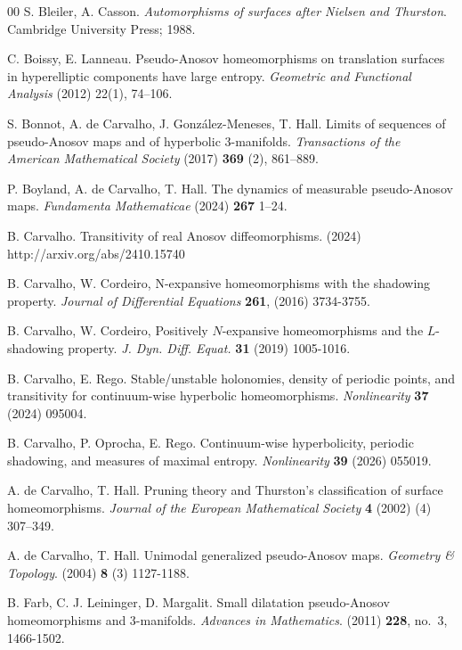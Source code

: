 \documentclass{amsart}
\theoremstyle{plain}
\theoremstyle{definition}
\begin{document}
\begin{thebibliography}{00}
 S. Bleiler, A. Casson. \emph{Automorphisms of surfaces after Nielsen and Thurston}. Cambridge University Press; 1988. 

 C. Boissy, E. Lanneau. Pseudo-Anosov homeomorphisms on translation surfaces in hyperelliptic components have large entropy. \emph{Geometric and Functional Analysis} (2012) 22(1), 74–106. 

 S. Bonnot, A. de Carvalho, J. González-Meneses, T. Hall. Limits of sequences of pseudo-Anosov maps and of hyperbolic 3-manifolds. \emph{Transactions of the American Mathematical Society} (2017) \textbf{369} (2), 861–889.

 P. Boyland, A. de Carvalho, T. Hall. The dynamics of measurable pseudo-Anosov maps. \emph{Fundamenta Mathematicae} (2024) \textbf{267} 1–24.

 B. Carvalho. Transitivity of real Anosov diffeomorphisms. (2024) http://arxiv.org/abs/2410.15740

 B. Carvalho, W. Cordeiro, N-expansive homeomorphisms with the shadowing property. \emph{Journal of Differential Equations} \textbf{261}, (2016) 3734-3755.
	
 B. Carvalho, W. Cordeiro, Positively $N$-expansive homeomorphisms and the $L$-shadowing property. \emph{J. Dyn. Diff. Equat.} \textbf{31} (2019) 1005-1016.

 B. Carvalho, E. Rego. Stable/unstable holonomies, density of periodic points, and transitivity for continuum-wise hyperbolic homeomorphisms. \emph{Nonlinearity} \textbf{37} (2024) 095004.

 B. Carvalho, P. Oprocha, E. Rego. Continuum-wise hyperbolicity, periodic shadowing, and measures of maximal entropy. \emph{Nonlinearity} \textbf{39} (2026) 055019.

 A. de Carvalho, T. Hall. Pruning theory and Thurston’s classification of surface homeomorphisms. \emph{Journal of the European Mathematical Society} \textbf{4} (2002) (4) 307–349.

 A. de Carvalho, T. Hall. Unimodal generalized pseudo-Anosov maps. \emph{Geometry \& Topology}. (2004) \textbf{8} (3) 1127-1188.

 B. Farb, C. J. Leininger, D. Margalit. Small dilatation pseudo-Anosov homeomorphisms and 3-manifolds. \emph{Advances in Mathematics}. (2011) {\bf 228}, no.~3, 1466-1502.



\end{thebibliography}
\end{document}
